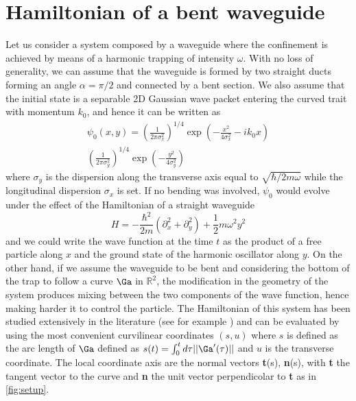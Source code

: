 \section{Hamiltonian of a bent waveguide}
Let us consider a system composed by a waveguide where the confinement is achieved by means of a harmonic trapping of intensity $ \omega $.
With no loss of generality, we can assume that the waveguide is formed by two straight ducts forming an angle $\alpha = \pi/2$ and connected by a bent section.
We also assume that the initial state is a separable 2D Gaussian wave packet entering the curved trait with momentum $k_0$, and hence it can be written as 
\begin{align}
\label{eq:initial_state}
	\psi_{0}(x,y) = \left(\frac{1}{2 \pi \sigma_{x}^{2}}\right)^{1/4}\exp\left(- \frac{x^{2}}{4\sigma_{x}^{2}} - i k_{0}x  \right)\\
	\left(\frac{1}{2\pi\sigma_{y}^{2}}\right)^{1/4}\exp\left(-\frac{y^{2}}{4\sigma_{y}^{2}}\right)
\end{align}
where $ \sigma_{y} $  is the dispersion along the transverse axis equal to $\sqrt{\hbar/2 m \omega}$ while the longitudinal dispersion $ \sigma_{x} $ is set.
If no bending was involved, $\psi_0$  would evolve under the effect of the Hamiltonian of a straight waveguide 
\begin{equation}
	\label{eq:straightwave}
	 H = -\frac{\hbar^2}{2m} \left(\partial_{x}^{2} + \partial_{y}^{2}\right) + \frac{1}{2}m\omega^2y^2
\end{equation}
and we could write the wave function at the time $t$ as the product of a free particle along $x$ and the ground state of the harmonic oscillator along $y$. 
On the other hand, if we assume the waveguide to be bent and considering the bottom of the trap to follow a curve $\Ga$ in $\mathbb{R}^2$, the modification in the geometry of the system produces mixing between the two components of the wave function, hence making harder it to control the particle.
The Hamiltonian of this system has been studied extensively in the literature (see for example \cite{TheEffectiveHKrejci2012}) and can be evaluated by using the most convenient curvilinear coordinates $(s,u)$ where $s$ is defined as the arc length of $\Ga$ defined as $s(t) = \int_0^t d\tau||\Ga'(\tau)||$ and $u$ is the transverse coordinate.
The local coordinate axis are the normal vectors \textbf{t}(s), \textbf{n}(s), with \textbf{t} the tangent vector to the curve and \textbf{n} the unit vector perpendicolar to \textbf{t} as in  \cref{fig:setup}.
